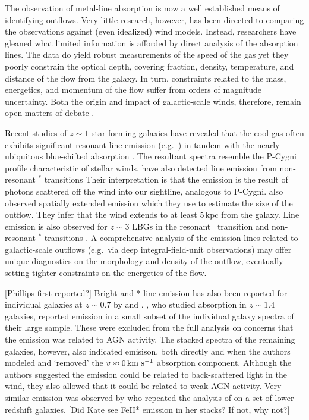\documentclass[12pt,preprint]{aastex}
\begin{document}
The observation of metal-line absorption is now a well established
means of identifying outflows. Very little research,
however,  has been directed
to comparing the observations against (even idealized) wind
models.  Instead, researchers have gleaned what limited information
is afforded by direct analysis of the absorption lines.  The data do yield
robust measurements of the speed of the gas yet they poorly constrain the
optical depth, covering fraction, density, temperature, and distance
of the flow from the galaxy.   In turn, constraints related to the
mass, energetics, and momentum of the flow suffer from
orders of magnitude uncertainty.  Both the origin and impact of
galactic-scale winds, therefore, remain open matters of debate
\citep{debate}.

Recent studies of $z \sim 1$ star-forming galaxies have revealed that
the cool gas often exhibits significant resonant-line emission (e.g.\
) in
tandem with the nearly ubiquitous blue-shifted absorption
\citep{wcp+09,rubin09,rubin+10b}.  The resultant spectra resemble the P-Cygni
profile characteristic of stellar winds.
\cite{rubin+10a} have also detected line
emission from non-resonant $^*$ transitions 
Their interpretation is that the emission is the result of photons
scattered off the wind into our sightline, analogous to P-Cygni.
\cite{rubin+10a} also observed spatially extended \ion{Mg}{2} emission
which they use to estimate the size of the outflow.  They infer that
the wind extends to at least 5\,kpc from the galaxy.  Line emission is
also observed for $z \sim 3$ LBGs in the resonant \lya\ transition
and non-resonant \ion{Si}{2}$^*$ transitions \citep{prs+02,shapley03}.
A comprehensive analysis of the emission lines
related to galactic-scale outflows
(e.g.\ via deep integral-field-unit observations) may offer unique
diagnostics on the morphology and density of the outflow, eventually
setting tighter constraints on the energetics of the flow.  

[Phillips first reported?]
Bright  and * line emission has also been
reported for individual galaxies at $z \sim 0.7$ by \cite{rubin+10b}
and \cite{rubin+10c}.   
\cite{wcp+09}, who
studied  absorption in $z \sim 1.4$ galaxies, reported
\ion{Mg}{2} emission in a small subset of the individual galaxy
spectra of their large sample.  These were excluded from the full
analysis on concerns that the emission was related to AGN activity.
The stacked spectra of the remaining galaxies, however, also indicated
\ion{Mg}{2} emisison, both directly and when the authors modeled and
`removed' the $v \approx 0\, {\rm km~s^{-1}}$ absorption component.  Although the
authors suggested the emission could be related to back-scattered
light in the wind, they also allowed that it could be related to weak
AGN activity.   Very similar \ion{Mg}{2} emission was observed by
\cite{rubin+10b} who repeated the analysis of \cite{wcp+09} on a set
of lower redshift galaxies. 
[Did Kate see FeII* emission in her stacks? If not, why not?]
\end{document}
